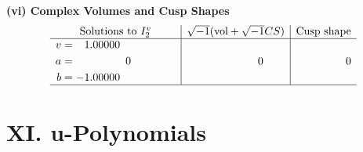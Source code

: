 \documentclass[1p]{elsarticle_modified}
\theoremstyle{definition}
\newcommand{\I}{\sqrt{-1}}
\begin{document}
\newpage\flushleft \textbf{(vi) Complex Volumes and Cusp Shapes}
$$\begin{array}{c|c|c}  
\text{Solutions to }I^v_{2}& \I (\text{vol} + \sqrt{-1}CS) & \text{Cusp shape}\\
 \hline 
\begin{aligned}
v &= \phantom{-}1.00000\phantom{ +0.000000I} \\
a &= \phantom{-0.000000 } 0 \\
b &= -1.00000\phantom{ +0.000000I}\end{aligned}
 & \phantom{-0.000000 } 0 & \phantom{-0.000000 } 0\\
 \hline 
 \end{array}$$\newpage
\newpage\renewcommand{\arraystretch}{1}
\centering \section*{ XI. u-Polynomials}
\end{document}
